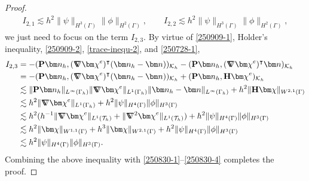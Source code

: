 \documentclass[10pt, a4paper]{amsart}
\newcommand{\bn}{{\bm n}}
\newcommand{\nab}{\nabla}
\newcommand{\calT}{\mathcal{T}}
\newcommand{\calK}{\mathcal{K}}
\newcommand{\Grad}{\nabla\!\!\!\!\nabla}
\newcommand{\bchi}{{\bm \chi}}
\newtheorem{lemma}[theorem]{Lemma}
\theoremstyle{definition}
\theoremstyle{remark}
\theoremstyle{example}
\numberwithin{equation}{section}
\newcommand{\tbar}[1]{{\left\vert\kern-0.25ex\left\vert\kern-0.25ex\left\vert #1 
    \right\vert\kern-0.25ex\right\vert\kern-0.25ex\right\vert}}
\begin{document}
\begin{proof}
\begin{align}
I_{2,1} \lesssim h^2\|\psi\|_{H^3(\Gamma)}\|\phi\|_{H^2(\Gamma)}, \qquad I_{2,2} \lesssim h^2\|\psi\|_{H^3(\Gamma)}\|\phi\|_{H^2(\Gamma)}, \label{250830-4}
\end{align}
we just need to focus on the term $I_{2,3}$. By virtue of \eqref{250909-1}, Holder’s inequality, \eqref{250909-2}, \eqref{trace-inequ-2}, and \eqref{250728-1},
\begin{align*}
I_{2,3}
& = - ({\bf P}\bn_h, (\Grad\bchi^e)^\intercal(\bn_h - \bn))_{\calK_h} - ({\bf P}\bn_h, (\Grad\bchi^e)^\intercal\bn)_{\calK_h} \\
& = - ({\bf P}\bn_h, (\Grad\bchi^e)^\intercal(\bn_h - \bn))_{\calK_h} + ({\bf P}\bn_h, {\bf H}\bchi^e)_{\calK_h} \\
& \lesssim \|{\bf P}\bn_h\|_{L^\infty(\Gamma_h)}\|\Grad\bchi^e\|_{L^1(\Gamma_h)}\|\bn_h - \bn\|_{L^\infty(\Gamma_h)} + h^2\|{\bf H}\bchi\|_{W^{2, 1}(\Gamma)} \\
& \lesssim h^2\|\Grad\bchi^e\|_{L^1(\Gamma_h)} + h^2\|\psi\|_{H^4(\Gamma)}\|\phi\|_{H^3(\Gamma)} \\
& \lesssim h^2(h^{-1}\|\Grad\bchi^e\|_{L^1(\calT_h)} + \|\Grad^2\bchi^e\|_{L^1(\calT_h)}) + h^2\|\psi\|_{H^4(\Gamma)}\|\phi\|_{H^3(\Gamma)} \\
& \lesssim h^2\|\bchi\|_{W^{1, 1}(\Gamma)} + h^3\|\bchi\|_{W^{2, 1}(\Gamma)} + h^2\|\psi\|_{H^4(\Gamma)}\|\phi\|_{H^3(\Gamma)} \\
& \lesssim h^2\|\psi\|_{H^4(\Gamma)}\|\phi\|_{H^3(\Gamma)}.
\end{align*}
Combining the above inequality with \eqref{250830-1}--\eqref{250830-4} completes the proof.
\end{proof}




\end{document}
